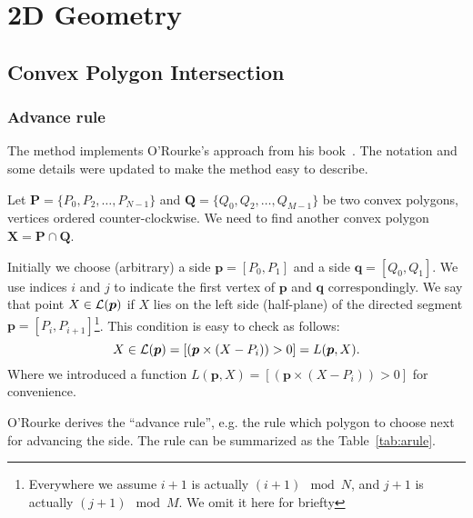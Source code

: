 
\chapter{2D Geometry}\label{ch:geometry2d}

\section{Convex Polygon Intersection}

\subsection{Advance rule}

The method implements O'Rourke's approach from his
book~\cite{bib:orourke}. The notation and some details were updated to
make the method easy to describe.

Let $\bm{P}=\{P_0,P_2,\dots,P_{N-1}\}$ and
$\bm{Q}=\{Q_0,Q_2,\dots,Q_{M-1}\}$ be two convex polygons, vertices
ordered counter-clockwise. We need to find another convex polygon
$\bm{X}=\bm{P}\cap\bm{Q}$.

Initially we choose (arbitrary) a side $\bm{p}=[P_0,P_1]$ and a side
$\bm{q}=[Q_0,Q_1]$. We use indices $i$ and $j$ to indicate the
first vertex of $\bm{p}$ and $\bm{q}$ correspondingly. 
We say that point $X\in {\cal L}(\bm{p})$ if $X$ lies on the left side
(half-plane) of the directed segment
$\bm{p}=[P_i,P_{i+1}]$\footnote{Everywhere we assume $i+1$ is actually
$(i+1) \mod N$, and $j+1$ is actually $(j+1)\mod M$. We omit it here
  for briefty}. This
condition is easy to check as follows:
\begin{equation}
  X \in {\cal L}(\bm{p}) =
  \left[ \left( { \bm{p} \times (X-P_i) } \right) > 0 \right]
  = L ( \bm{p}, X ).
\end{equation}
Where we introduced a function $L(\bm{p},X) = \left[\left( { \bm{p}
    \times (X-P_i) } \right) > 0\right]$ for convenience.

O'Rourke derives the ``advance rule'', e.g. the rule which polygon to
choose next for advancing the side. The rule can be summarized as the
Table~\ref{tab:arule}.

